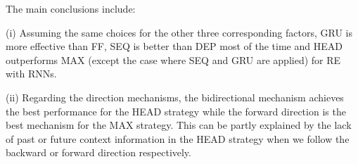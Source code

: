 \documentclass[11pt,letterpaper]{article}
\begin{document}
\begin{comment}
\begin{table}[htbp]
\small
\centering
\begin{tabular}{|c|c|c|c|}
\hline
\multicolumn{1}{|l|}{} & \multicolumn{1}{l|}{} & SEQ & DEP \\ \hline
ff & head & 63.22 & 60.78 \\ \hline
\multicolumn{ 1}{|c|}{} & \multicolumn{ 1}{c|}{} & 60.05 & 55.55 \\ \cline{ 3- 4}
\multicolumn{ 1}{|c|}{} & \multicolumn{ 1}{c|}{} & 58.54 & 57.69 \\ \cline{ 2- 4}
\multicolumn{ 1}{|c|}{} & \multicolumn{ 1}{c|}{} & 51.22 & 50 \\ \cline{ 3- 4}
\multicolumn{ 1}{|c|}{} & \multicolumn{ 1}{c|}{} & 53.96 & 52.08 \\ \cline{ 3- 4}
\multicolumn{ 1}{|c|}{} & \multicolumn{ 1}{c|}{} & 33.5 & 45.07 \\ \hline
\multicolumn{ 1}{|c|}{} & \multicolumn{ 1}{c|}{} & 63.23 & 63.32 \\ \cline{ 3- 4}
\multicolumn{ 1}{|c|}{} & \multicolumn{ 1}{c|}{} & 62.77 & 63.69 \\ \cline{ 3- 4}
\multicolumn{ 1}{|c|}{} & \multicolumn{ 1}{c|}{} & 62.55 & 61.57 \\ \cline{ 2- 4}
\multicolumn{ 1}{|c|}{} & \multicolumn{ 1}{c|}{} & 64.24 & 60.96 \\ \cline{ 3- 4}
\multicolumn{ 1}{|c|}{} & \multicolumn{ 1}{c|}{} & 64.59 & 61.97 \\ \cline{ 3- 4}
\multicolumn{ 1}{|c|}{} & \multicolumn{ 1}{c|}{} & 64.3 & 61.56 \\ \hline
\end{tabular}
\caption{Performance of RNNs on the dev set}
\label{tab:rnn}
\end{table}
\end{comment}

The main conclusions include:

(i) Assuming the same choices for the other three corresponding factors, GRU is more effective than FF, SEQ is better than DEP most of the time and HEAD outperforms MAX (except the case where SEQ and GRU are applied) for RE with RNNs.

(ii) Regarding the direction mechanisms,  the bidirectional mechanism achieves the best performance for the HEAD strategy while the forward direction is the best mechanism for the MAX strategy. This can be partly explained by the lack of past or future context information in the HEAD strategy when we follow the backward or forward direction respectively.
\end{document}
